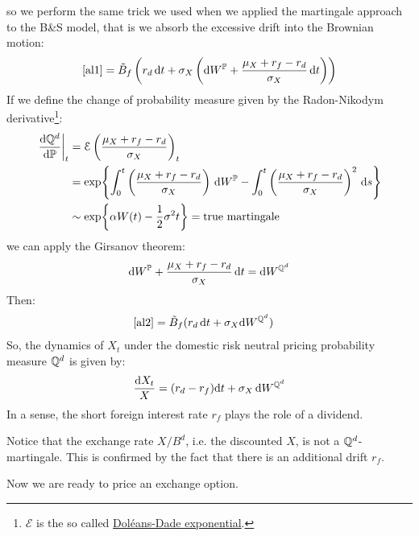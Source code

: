 so we perform the same trick we used when we applied the martingale approach to the B\&S model, that is we absorb the excessive drift into the Brownian motion:
\begin{equation}\label{al2}
    \eqref{al1} = \Tilde{B}_f\left(r_d\,\dd t + \sigma_X\left(\dd W^{\mathbb{P}} + \dfrac{\mu_X + r_f-r_d}{\sigma_X}\,\dd t\right)\right)
\end{equation}
If we define the change of probability measure given by the Radon-Nikodym derivative\footnote{$\mathcal{E}$ is the so called \href{https://en.wikipedia.org/wiki/Dol\%C3\%A9ans-Dade\_exponential}{Doléans-Dade exponential}.}:
\begin{align}
    \notag\eval{\frac{\dd \Qmeas^d}{\dd \Pmeas}}_t &= \mathcal{E}\left(\dfrac{\mu_X + r_f-r_d}{\sigma_X}\right)_t \\
    &=
    \notag\exp{\int_0^t \left(\dfrac{\mu_X + r_f-r_d}{\sigma_X}\right)\,\dd W^{\Pmeas} - \int_0^t \left(\dfrac{\mu_X + r_f-r_d}{\sigma_X}\right)^2\,\dd s} \\
    &\sim
    \exp{\alpha W(t) - \frac{1}{2}\sigma^2 t} = \text{true martingale}
\end{align}
we can apply the Girsanov theorem:
\begin{equation*}
    \dd W^{\mathbb{P}} + \dfrac{\mu_X + r_f-r_d}{\sigma_X}\,\dd t = \dd W^{\mathbb{Q}^d}
\end{equation*}
Then:
\begin{align}
    \eqref{al2} &= \Tilde{B}_f(r_d\,\dd t + \sigma_X\dd W^{\mathbb{Q}^d})
\end{align}
So, the dynamics of $X_t$ under the domestic risk neutral pricing probability measure $\mathbb{Q}^d$ is given by:
\begin{equation}\label{dynX}
    \dfrac{\dd X_t}{X} = (r_d - r_f)\dd t + \sigma_X\,\dd W^{\mathbb{Q}^d}
\end{equation}
In a sense, the short foreign interest rate $r_f$ plays the role of a dividend.
\begin{remark}
    Notice that the exchange rate $X/B^d$, i.e. the discounted $X$, is not a $\mathbb{Q}^d$-martingale. This is confirmed by the fact that there is an additional drift $r_f$.
\end{remark} %
Now we are ready to price an exchange option.
